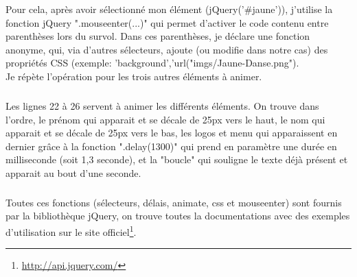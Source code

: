 \documentclass[11pt,a4paper]{report}
\begin{document}
				Pour cela, après avoir sélectionné mon élément (jQuery('\#jaune')), j'utilise la fonction jQuery ".mouseenter(...)" qui permet d'activer le code contenu entre parenthèses lors du survol. Dans ces parenthèses, je déclare une fonction anonyme, qui, via d'autres sélecteurs, ajoute (ou modifie dans notre cas) des propriétés CSS (exemple: 'background','url("imgs/Jaune-Danse.png").\\
				Je répète l'opération pour les trois autres éléments à animer.
				\subparagraph*{}Les lignes 22 à 26 servent à animer les différents éléments. On trouve dans l'ordre, le prénom qui apparait et se décale de 25px vers le haut, le nom qui apparait et se décale de 25px vers le bas, les logos et menu qui apparaissent en dernier grâce à la fonction ".delay(1300)" qui prend en paramètre une durée en milliseconde (soit 1,3 seconde), et la "boucle" qui souligne le texte déjà présent et apparait au bout d'une seconde.
				\subparagraph*{}Toutes ces fonctions (sélecteurs, délais, animate, css et mouseenter) sont fournis par la bibliothèque jQuery, on trouve toutes la documentations avec des exemples d'utilisation sur le site officiel\footnote{\url{http://api.jquery.com/}}.
\end{document}
